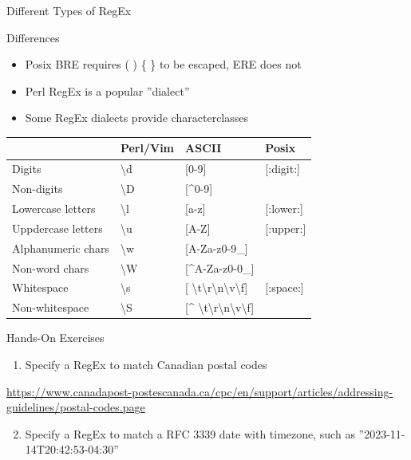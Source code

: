 \documentclass[ignorenonframetext,xcolor=x11names]{beamer}
\begin{document}
\begin{frame}{Different Types of RegEx}
\begin{block}{Differences}
\begin{itemize}
  \item Posix BRE requires ( ) \{ \} to be escaped, ERE does not
  \item Perl RegEx is a popular ''dialect''
  \item Some RegEx dialects provide characterclasses
\end{itemize}
\end{block}
\centering
\renewcommand{\arraystretch}{1.25}

\footnotesize
\begin{tabular}{l|l|l|l} 
                  & \textbf{Perl/Vim} & \textbf{ASCII} & \textbf{Posix} \\ \hline
Digits            & \textbackslash d & [0-9]  & [:digit:]  \\
Non-digits        & \textbackslash D & [\textasciicircum 0-9] & \\
Lowercase letters & \textbackslash l & [a-z] & [:lower:] \\
Uppdercase letters & \textbackslash u & [A-Z] & [:upper:] \\
Alphanumeric chars & \textbackslash w & [A-Za-z0-9\_] & \\
Non-word chars    & \textbackslash W & [\textasciicircum A-Za-z0-0\_] & \\
Whitespace        & \textbackslash s & [ \textbackslash t\textbackslash r\textbackslash n\textbackslash v\textbackslash f] & [:space:] \\
Non-whitespace    & \textbackslash S & [\textasciicircum{ } \textbackslash t\textbackslash r\textbackslash n\textbackslash v\textbackslash f] & \\ \hline
\end{tabular}
\end{frame}

\begin{frame}{Hands-On Exercises}
\begin{enumerate}
	\item Specify a RegEx to match Canadian postal codes
\end{enumerate}
\vspace{5mm}
\url{https://www.canadapost-postescanada.ca/cpc/en/support/articles/addressing-guidelines/postal-codes.page} \\ 
\begin{enumerate}
	\setcounter{enumi}{1}
	\item Specify a RegEx to match a RFC 3339 date with timezone, such as ''2023-11-14T20:42:53-04:30''
\end{enumerate}
\end{frame}
\end{document}
